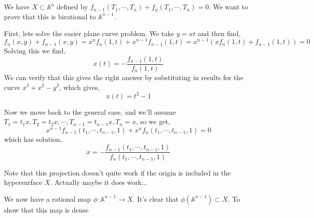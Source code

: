 \documentclass{article}
\begin{document}
\subsection{}

\subsection{}

\subsection{}
We have \(X \subset \mathbb{A}^{n}\) defined by \(f_{n-1}(T_{1}, \cdots, T_{n}) + f_{n}(T_{1}, \cdots, T_{n}) = 0\). We want to prove that this is birational to \(\mathbb{A}^{n-1}\).

First, lets solve the easier plane curve problem. We take \(y = xt\) and then find,
\begin{equation}
f_{n}(x, y) + f_{n-1}(x, y) = x^{n}f_{n}(1, t) + x^{n-1}f_{n-1}(1, t) = x^{n-1}(xf_{n}(1, t) + f_{n-1}(1, t)) = 0
\end{equation}
Solving this we find,
\begin{equation}
x(t) = -\frac{f_{n-1}(1, t)}{f_{n}(1, t)}
\end{equation}
We can verify that this gives the right answer by substituting in results for the curve \(x^{3} + x^{2} - y^{2}\), which gives,
\begin{equation}
x(t) = t^{2} - 1
\end{equation}

Now we move back to the general case, and we'll assume \(T_{1} = t_{1}x, T_{2} = t_{2}x, \cdots, T_{n-1} = t_{n-1}x, T_{n} = x\), so we get,
\begin{equation}
x^{n-1}f_{n-1}(t_{1}, \cdots, t_{n-1}, 1) + x^{n}f_{n}(t_{1}, \cdots, t_{n-1}, 1) = 0
\end{equation}
which has solution,
\begin{equation}
x = -\frac{f_{n-1}(t_{1}, \cdots, t_{n-1}, 1)}{f_{n}(t_{1}, \cdots, t_{n-1}, 1)}
\end{equation}

Note that this projection doesn't quite work if the origin is included in the hypersurface \(X\). Actually maybe it does work...

We now have a rational map \(\phi : \mathbb{A}^{n-1} \to X\). It's clear that \(\phi(\mathbb{A}^{n-1}) \subset X\). To show that this map is dense

\end{document}
